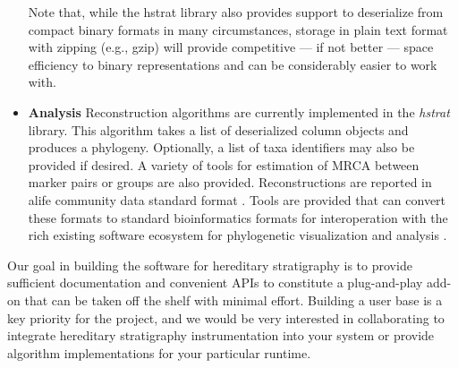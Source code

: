 \begin{itemize}
Note that, while the hstrat library also provides support to deserialize from compact binary formats in many circumstances, storage in plain text format with zipping (e.g., gzip) will provide competitive --- if not better --- space efficiency to binary representations and can be considerably easier to work with.

\item \textbf{Analysis}
Reconstruction algorithms are currently implemented in the \textit{hstrat} library.
This algorithm takes a list of deserialized column objects and produces a phylogeny.
Optionally, a list of taxa identifiers may also be provided if desired.
A variety of tools for estimation of MRCA between marker pairs or groups are also provided.
Reconstructions are reported in alife community data standard format \citep{TODO}.
Tools are provided that can convert these formats to standard bioinformatics formats for interoperation with the rich existing software ecosystem for phylogenetic visualization and analysis \citep{TODOalifedataphyloinformaticsconvert}.
\end{itemize}

Our goal in building the software for hereditary stratigraphy is to provide sufficient documentation and convenient APIs to constitute a plug-and-play add-on that can be taken off the shelf with minimal effort.
Building a user base is a key priority for the project, and we would be very interested in collaborating to integrate hereditary stratigraphy instrumentation into your system or provide algorithm implementations for your particular runtime.

